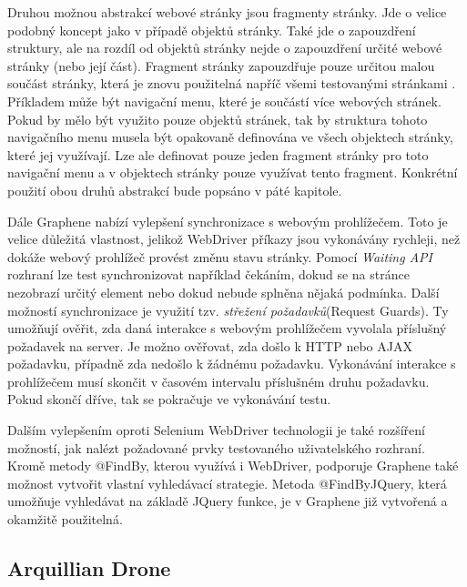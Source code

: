 \documentclass[
    color,   %
	table,   %
    twoside, %
]{fithesis3}
\begin{document}
Druhou možnou abstrakcí webové stránky jsou fragmenty stránky. Jde o velice podobný koncept jako v případě objektů stránky. Také jde o zapouzdření struktury, ale na rozdíl od objektů stránky nejde o zapouzdření určité webové stránky (nebo její část). Fragment stránky zapouzdřuje pouze určitou malou součást stránky, která je znovu použitelná napříč všemi testovanými stránkami \cite{Graphene}. Příkladem může být navigační menu, které je součástí více webových stránek. Pokud by mělo být využito pouze objektů stránek, tak by struktura tohoto navigačního menu musela být opakovaně definována ve všech objektech stránky, které jej využívají. Lze ale definovat pouze jeden fragment stránky pro toto navigační menu a v objektech stránky pouze využívat tento fragment. Konkrétní použití obou druhů abstrakcí bude popsáno v páté kapitole.

Dále Graphene nabízí vylepšení synchronizace s webovým prohlížečem. Toto je velice důležitá vlastnost, jelikož WebDriver příkazy jsou vykonávány rychleji, než dokáže webový prohlížeč provést změnu stavu stránky. Pomocí \emph{Waiting API} rozhraní lze test synchronizovat například čekáním, dokud se na stránce nezobrazí určitý element nebo dokud nebude splněna nějaká podmínka. Další možností synchronizace je využití tzv. \emph{střežení požadavků}(Request Guards). Ty umožňují ověřit, zda daná interakce s webovým prohlížečem vyvolala příslušný požadavek na server. Je možno ověřovat, zda došlo k HTTP nebo AJAX požadavku, případně zda nedošlo k žádnému požadavku. Vykonávání interakce s prohlížečem musí skončit v časovém intervalu příslušném druhu požadavku. Pokud skončí dříve, tak se pokračuje ve vykonávání testu.

Dalším vylepšením oproti Selenium WebDriver technologii je také rozšíření možností, jak nalézt požadované prvky testovaného uživatelského rozhraní. Kromě metody @FindBy, kterou využívá i WebDriver, podporuje Graphene také možnost vytvořit vlastní vyhledávací strategie. Metoda @FindByJQuery, která umožňuje vyhledávat na základě JQuery funkce, je v Graphene již vytvořená a okamžitě použitelná.

\subsection{Arquillian Drone}
\end{document}

